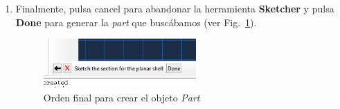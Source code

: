 \begin{enumerate}
\begin{enumerate}
  \item Finalmente, pulsa cancel para abandonar la herramienta
    \textbf{Sketcher} y pulsa \textbf{Done} para generar la
    \textit{part} que buscábamos (ver Fig.~\ref{figu08}).
    \begin{figure}[H]
      \begin{center}
        \includegraphics[width=0.55\textwidth]{./body/images/imagen08}
      \end{center}
      \caption{Orden final para crear el objeto \textit{Part}}
      \label{figu08}
    \end{figure}
  \end{enumerate}



\end{enumerate}
